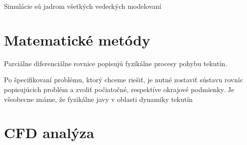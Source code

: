 \documentclass[]{tukediphc}
\begin{document}
%
%
%

Simulácie sú jadrom všetkých vedeckých modelovaní

\section{Matematické metódy}

Parciálne diferenciálne rovnice popisujú fyzikálne procesy pohybu tekutín.

Po špecifikovaní problému, ktorý chceme riešiť, je nutné zostaviť sústavu rovníc popisujúcich problém a zvoliť počiatočné, respektíve okrajové podmienky. Je všeobecne známe, že fyzikálne javy v oblasti dynamiky tekutín


\section{CFD analýza}
\end{document}
